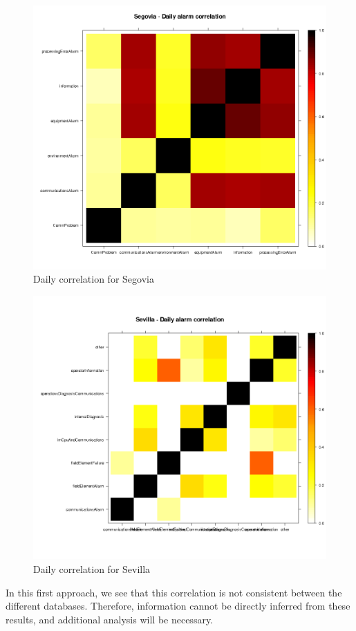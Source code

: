 \documentclass[a4paper,10pt]{article}
\begin{document}
\begin{figure}[h!]
 \centering
 \includegraphics[height=0.4\textheight]{./img/segovia_correlation.png}
 \caption{Daily correlation for Segovia}
 \label{fig:segovia}
\end{figure}
\begin{figure}[h!]
 \centering
 \includegraphics[height=0.4\textheight]{./img/sevilla_correlation.png}
 \caption{Daily correlation for Sevilla}
 \label{fig:sevilla}
\end{figure}

\clearpage

In this first approach, we see that this correlation is not consistent between the different databases. Therefore, information cannot be directly inferred from these results, and additional analysis will be necessary.
\end{document}
